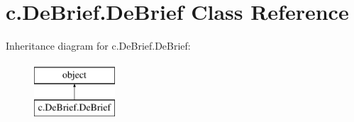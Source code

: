 \hypertarget{classc_1_1_de_brief_1_1_de_brief}{}\section{c.\+De\+Brief.\+De\+Brief Class Reference}
\label{classc_1_1_de_brief_1_1_de_brief}
Inheritance diagram for c.\+De\+Brief.\+De\+Brief\+:\begin{figure}[H]
\begin{center}
\leavevmode
\includegraphics[height=2.000000cm]{classc_1_1_de_brief_1_1_de_brief}
\end{center}
\end{figure}
